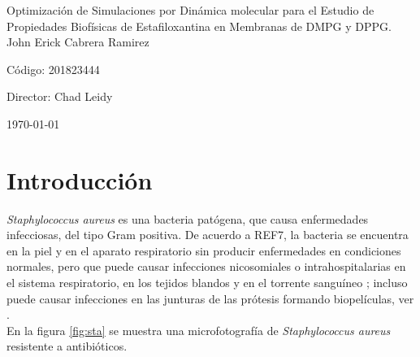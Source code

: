 \documentclass[12pt]{article}
\begin{document}
\begin{center}
\LARGE
Optimizaci\'{o}n de Simulaciones por Din\'{a}mica molecular para el Estudio de Propiedades Biof\'{i}sicas de Estafiloxantina en Membranas de DMPG y DPPG.\\
\vspace{3mm}
\large
John Erick Cabrera Ramirez 

 C\'odigo: 201823444


\vspace{2mm}
\large
Director: Chad Leidy

\normalsize
\vspace{2mm}

\today
\end{center}


\normalsize
\tableofcontents
\newpage
\section{Introducci\'on}

\textit{Staphylococcus aureus} es una bacteria pat\'{o}gena, que causa enfermedades infecciosas, del tipo Gram positiva. De acuerdo a REF7, la bacteria se encuentra en la piel y en el aparato respiratorio sin producir enfermedades en condiciones normales, pero que puede causar infecciones nicosomiales o intrahospitalarias en el sistema respiratorio, en los tejidos blandos y en el torrente sangu\'ineo \cite{1HarpavatS.NissimS.LipppincottsMicrocards:MicrobiologyFlashCards2012.}; incluso puede causar infecciones en las junturas de las pr\'otesis formando biopel\'iculas,  ver \cite{Meylan2018}.\\

En la figura \ref{fig:sta} se muestra una microfotograf\'ia de \textit{Staphylococcus aureus} resistente a antibi\'oticos.\\
\end{document}

